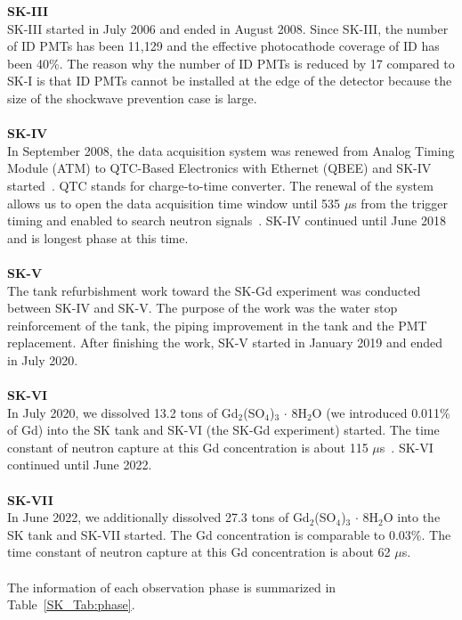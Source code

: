 \textbf{SK-III}\\
\hs SK-III started in July 2006 and ended in August 2008.
Since SK-III, the number of ID PMTs has been 11,129 and the effective photocathode coverage of ID has been 40\%.
The reason why the number of ID PMTs is reduced by 17 compared to SK-I is that ID PMTs cannot be installed at the edge of the detector because the size of the shockwave prevention case is large.\\
\\
\textbf{SK-IV}\\
\hs In September 2008, the data acquisition system was renewed from Analog Timing Module (ATM) to QTC-Based Electronics with Ethernet (QBEE) and SK-IV started~\cite{2009Nishino}.
QTC stands for charge-to-time converter.
The renewal of the system allows us to open the data acquisition time window until 535 $\mu$s from the trigger timing and enabled to search neutron signals~\cite{2009Watanabe}.
SK-IV continued until June 2018 and is longest phase at this time.\\
\\
\textbf{SK-V}\\
\hs The tank refurbishment work toward the SK-Gd experiment was conducted between SK-IV and SK-V.
The purpose of the work was the water stop reinforcement of the tank, the piping improvement in the tank and the PMT replacement.
After finishing the work, SK-V started in January 2019 and ended in July 2020.\\
\\
\textbf{SK-VI}\\
\hs In July 2020, we dissolved 13.2 tons of Gd$_{\text{2}}$(SO$_{\text{4}}$)$_{\text{3}}\,\cdot\,$8H$_{\text{2}}$O (we introduced 0.011\% of Gd) into the SK tank and SK-VI (the SK-Gd experiment) started.
The time constant of neutron capture at this Gd concentration is about 115 $\mu$s~\cite{2022Abe}.
SK-VI continued until June 2022.\\
\\
\textbf{SK-VII}\\
\hs In June 2022, we additionally dissolved 27.3 tons of Gd$_{\text{2}}$(SO$_{\text{4}}$)$_{\text{3}}\,\cdot\,$8H$_{\text{2}}$O into the SK tank and SK-VII started.
The Gd concentration is comparable to 0.03\%.
The time constant of neutron capture at this Gd concentration is about 62 $\mu$s.\\
\\
\hs The information of each observation phase is summarized in Table~\ref{SK_Tab:phase}.

